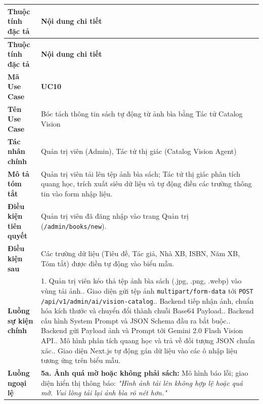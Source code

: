 \documentclass[11pt, a4paper]{report}
\begin{document}
\begin{longtable}{p{3.8cm} p{10.5cm}}
\toprule
\textbf{Thuộc tính đặc tả} & \textbf{Nội dung chi tiết} \\
\midrule
\endfirsthead
\toprule
\textbf{Thuộc tính đặc tả} & \textbf{Nội dung chi tiết} \\
\midrule
\endhead
\bottomrule
\endfoot
\textbf{Mã Use Case} & \textbf{UC10} \\
\midrule
\textbf{Tên Use Case} & Bóc tách thông tin sách tự động từ ảnh bìa bằng Tác tử Catalog Vision \\
\midrule
\textbf{Tác nhân chính} & Quản trị viên (Admin), Tác tử thị giác (Catalog Vision Agent) \\
\midrule
\textbf{Mô tả tóm tắt} & Quản trị viên tải lên tệp ảnh bìa sách; Tác tử thị giác phân tích quang học, trích xuất siêu dữ liệu và tự động điền các trường thông tin vào form nhập liệu. \\
\midrule
\textbf{Điều kiện tiên quyết} & Quản trị viên đã đăng nhập vào trang Quản trị (\texttt{/admin/books/new}). \\
\midrule
\textbf{Điều kiện sau} & Các trường dữ liệu (Tiêu đề, Tác giả, Nhà XB, ISBN, Năm XB, Tóm tắt) được điền tự động vào biểu mẫu. \\
\midrule
\textbf{Luồng sự kiện chính} & 
1. Quản trị viên kéo thả tệp ảnh bìa sách (.jpg, .png, .webp) vào vùng tải ảnh.\newline
2. Giao diện gửi tệp ảnh \texttt{multipart/form-data} tới \texttt{POST /api/v1/admin/ai/vision-catalog}.\newline
3. Backend tiếp nhận ảnh, chuẩn hóa kích thước và chuyển đổi thành chuỗi Base64 Payload.\newline
4. Backend cấu hình System Prompt và JSON Schema đầu ra bắt buộc.\newline
5. Backend gửi Payload ảnh và Prompt tới Gemini 2.0 Flash Vision API.\newline
6. Mô hình phân tích quang học và trả về đối tượng JSON chuẩn xác.\newline
7. Giao diện Next.js tự động gán dữ liệu vào các ô nhập liệu tương ứng trên biểu mẫu. \\
\midrule
\textbf{Luồng ngoại lệ} & 
\textbf{5a. Ảnh quá mờ hoặc không phải sách:} Mô hình báo lỗi; giao diện hiển thị thông báo: \textit{"Hình ảnh tải lên không hợp lệ hoặc quá mờ. Vui lòng tải lại ảnh bìa rõ nét hơn."} \\
\bottomrule
\end{longtable}
\end{document}
